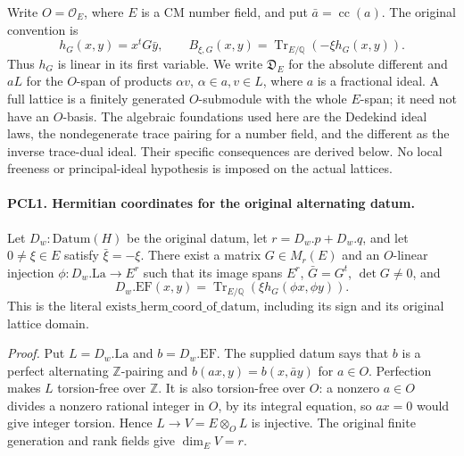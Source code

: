 \documentclass[11pt,a4paper]{article}
\numberwithin{equation}{section}
\theoremstyle{remark}\newtheorem{remark}[theorem]{Remark}
\begin{document}
Write \(O=\mathcal O_E\), where \(E\) is a CM number field, and put
\(\bar a=\operatorname{cc}(a)\).  The original convention is
\[
 h_G(x,y)=x^tG\bar y,\qquad
 B_{\xi,G}(x,y)=\operatorname{Tr}_{E/\mathbb Q}
                                      (-\xi h_G(x,y)).       \tag{PCL.1}
\]
Thus \(h_G\) is linear in its first variable.  We write
\(\mathfrak D_E\) for the absolute different and \(aL\) for the
\(O\)-span of products \(\alpha v\), \(\alpha\in a,v\in L\),
where \(a\) is a fractional ideal.  A full lattice is a finitely
generated \(O\)-submodule with the whole \(E\)-span; it need not
have an \(O\)-basis.  The algebraic foundations used here are the
Dedekind ideal laws, the nondegenerate trace pairing for a number
field, and the different as the inverse trace-dual ideal.  Their
specific consequences are derived below.  No local freeness or
principal-ideal hypothesis is imposed on the actual lattices.

\paragraph{PCL1. Hermitian coordinates for the original alternating datum.}
\label{claim:PCL1}
Let \(D_w:\mathrm{Datum}(H)\) be the original datum, let
\(r=D_w.p+D_w.q\), and let \(0\ne\xi\in E\) satisfy
\(\bar\xi=-\xi\).  There exist a matrix \(G\in M_r(E)\)
and an \(O\)-linear injection \(\phi:D_w.\mathrm{La}\to E^r\)
such that its image spans \(E^r\), \(\bar G=G^t\),
\(\det G\ne0\), and
\[
 D_w.\mathrm{EF}(x,y)
       =\operatorname{Tr}_{E/\mathbb Q}
                            (\xi h_G(\phi x,\phi y)).       \tag{PCL.2}
\]
This is the literal \(\mathrm{exists\_\allowbreak herm\_\allowbreak coord\_\allowbreak of\_\allowbreak datum}\),
including its sign and its original lattice domain.

\emph{Proof.}
Put \(L=D_w.\mathrm{La}\) and \(b=D_w.\mathrm{EF}\).
The supplied datum says that \(b\) is a perfect alternating
\(\mathbb Z\)-pairing and
\(b(ax,y)=b(x,\bar a y)\) for \(a\in O\).
Perfection makes \(L\) torsion-free over \(\mathbb Z\).
It is also torsion-free over \(O\): a nonzero \(a\in O\)
divides a nonzero rational integer in \(O\), by its integral
equation, so \(ax=0\) would give integer torsion.  Hence
\(L\to V=E\otimes_O L\) is injective.  The original finite
generation and rank fields give \(\dim_E V=r\).
\end{document}
